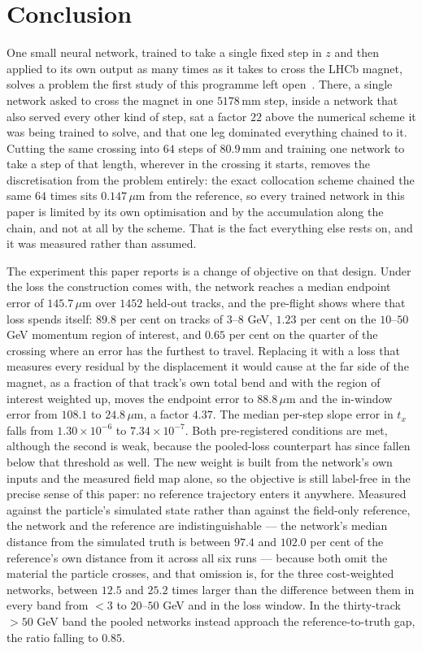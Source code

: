 \documentclass[11pt,a4paper]{article}
\newcommand{\um}{\ensuremath{\,\mu\mathrm{m}}}
\newcommand{\mm}{\ensuremath{\,\mathrm{mm}}}
\begin{document}
\section{Conclusion}
\label{sec:conclusion}

One small neural network, trained to take a single fixed step in $z$ and then
applied to its own output as many times as it takes to cross the LHCb magnet,
solves a problem the first study of this programme left
open~\citep{scriven2026lhcb1}. There, a single network asked to cross the
magnet in one $5178\mm$ step, inside a network that also served every other
kind of step, sat a factor $22$ above the numerical scheme it was being trained
to solve, and that one leg dominated everything chained to it. Cutting the same
crossing into $64$ steps of $80.9\mm$ and training one network to take a step
of that length, wherever in the crossing it starts, removes the discretisation
from the problem entirely: the exact collocation scheme chained the same $64$
times sits $0.147\um$ from the reference, so every trained network in this paper
is limited by its own optimisation and by the accumulation along the chain, and
not at all by the scheme. That is the fact everything else rests on, and it was
measured rather than assumed.

The experiment this paper reports is a change of objective on that design.
Under the loss the construction comes with, the network reaches a median
endpoint error of $145.7\um$ over $1452$ held-out tracks, and the pre-flight
shows where that loss spends itself: $89.8$ per cent on tracks of $3$--$8$ GeV,
$1.23$ per cent on the $10$--$50$ GeV momentum region of interest, and $0.65$
per cent on the quarter of the crossing where an error has the furthest to
travel. Replacing it with a loss that measures every residual by the
displacement it would cause at the far side of the magnet, as a fraction of
that track's own total bend and with the region of interest weighted up, moves
the endpoint error to $88.8\um$ and the in-window error from $108.1$ to
$24.8\um$, a factor $4.37$. The median per-step slope error in $t_x$ falls from
$1.30\times10^{-6}$ to $7.34\times10^{-7}$. Both pre-registered conditions are
met, although the second is weak, because the pooled-loss counterpart has since
fallen below that threshold as well. The new weight is built from the network's
own inputs and the measured field map alone, so the objective is still
label-free in the precise sense of this paper: no reference trajectory enters
it anywhere. Measured against the particle's simulated state rather than
against the field-only reference, the network and the reference are
indistinguishable --- the network's median distance from the simulated truth is
between $97.4$ and $102.0$ per cent of the reference's own distance from it
across all six runs --- because both omit the material the particle crosses,
and that omission is, for the three cost-weighted networks, between $12.5$ and
$25.2$ times larger than the difference between them in every band from $<3$ to
$20$--$50$ GeV and in the loss window. In the thirty-track $>50$ GeV band the
pooled networks instead approach the reference-to-truth gap, the ratio falling
to $0.85$.
\end{document}
